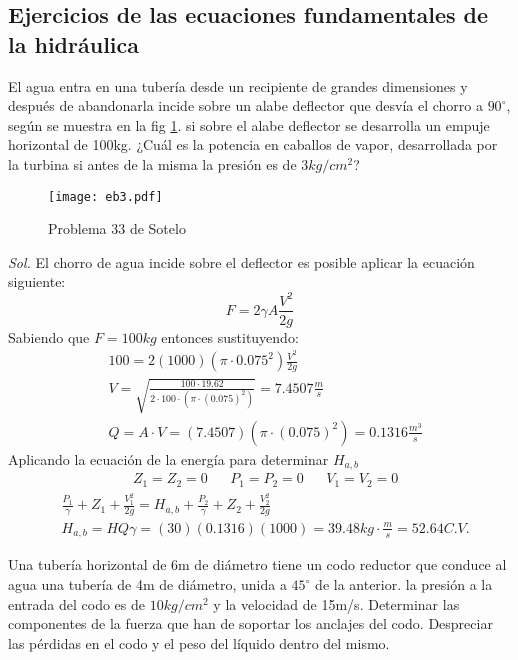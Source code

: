 \subsection{Ejercicios de las ecuaciones fundamentales de la hidráulica}
\begin{problem}
    El agua entra en una tubería desde un recipiente de grandes dimensiones y después de abandonarla incide sobre un alabe deflector que desvía el chorro a $90^{\circ}$, según se muestra en la fig \ref{eb3}. si sobre el alabe deflector se desarrolla un empuje horizontal de 100kg. ¿Cuál es la potencia en caballos de vapor, desarrollada por la turbina si antes de la misma la presión es de $3kg/cm^2$?
\end{problem}
\begin{figure}[h!]
\centering
  \texttt{[image: eb3.pdf]}
  \caption{Problema 33 de Sotelo}
  \label{eb3}
\end{figure}
\textit{ Sol. }
El chorro de agua incide sobre el deflector es posible aplicar la ecuación siguiente:
\begin{equation*}
    F = 2\gamma A \frac{V^2}{2g}
\end{equation*}
Sabiendo que $F = 100kg$ entonces sustituyendo:
\begin{align*}
    &100 = 2(1000)(\pi\cdot 0.075^2)\frac{V^2}{2g}\\
    &V = \sqrt{\frac{100\cdot 19.62}{2 \cdot 100 \cdot \left(\pi \cdot (0.075)^2\right)}} = 7.4507 \frac{m}{s} \\
    &Q = A\cdot V = \left(7.4507\right)\left(\pi \cdot (0.075)^2\right) = 0.1316 \frac{m^3}{s}
\end{align*}
Aplicando la ecuación de la energía para determinar $H_{a,b}$
\begin{align*}
    &Z_1 = Z_2 = 0&& P_1 = P_2 = 0&&V_1 = V_2 = 0
\end{align*}
\begin{align*}
    &\frac{P_1}{\gamma} + Z_1 + \frac{V_1^2}{2g} = H_{a,b} + \frac{P_2}{\gamma} + Z_2 + \frac{V_2^2}{2g}\\
    &H_{a,b} =HQ\gamma = (30)(0.1316)(1000) = 39.48kg\cdot \frac{m}{s} = 52.64 C.V.
\end{align*}
\begin{problem}
    Una tubería horizontal de 6m de diámetro tiene un codo reductor que conduce al agua una tubería de 4m de diámetro, unida a $45^{\circ}$ de la anterior. la presión a la entrada del codo es de $10kg/cm^2$ y la velocidad de 15m/s. Determinar las componentes de la fuerza que han de soportar los anclajes del codo. Despreciar las pérdidas en el codo y el peso del líquido dentro del mismo.
\end{problem}
